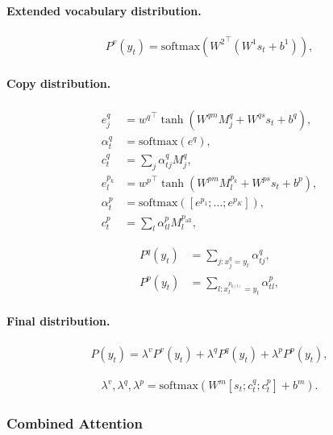 \documentclass[11pt,a4paper]{article}
\theoremstyle{mydef}
\theoremstyle{myprob}
\begin{document}
\paragraph{Extended vocabulary distribution.}

\begin{align}
P^v(y_t)  =\mathrm{softmax}({W^2}^\top (W^1 s_t  + b^1)),
\end{align}

\paragraph{Copy distribution.}

\begin{align}
e^q_j &= {w^q}^\top \tanh(W^{qm} M_j^q + W^{qs} s_t +b^q), \\
\alpha^q_t &= \mathrm{softmax}(e^q), \\ 
c^q_t &= \textstyle \sum_j \alpha^q_{tj} M_j^q, \\
e^{p_k}_l &= {w^p}^\top \tanh(W^{pm} M_l^{p_k} + W^{ps} s_t +b^p), \\
\alpha^p_t &= \mathrm{softmax}([e^{p_1}; \ldots; e^{p_K}]), \\
c^p_t &=  \textstyle \sum_{l} \alpha^p_{tl} M^{p_\mathrm{all}}_{l}, 
\end{align}

\begin{align}
P^q(y_t) &=  \textstyle \sum_{j: x^q_j = y_t} \alpha^q_{tj}, \\
P^p(y_t) &= \textstyle \sum_{l: x^{p_{k(l)}}_{l} = y_t} \alpha^p_{tl},
\end{align}

\paragraph{Final distribution.}

\begin{align}
P(y_t) = \lambda^v P^v(y_t) +  \lambda^q P^q(y_t) + \lambda^p P^p(y_t),
\end{align}

\begin{align}
\lambda^v, \lambda^q, \lambda^p = \mathrm{softmax}(W^m [s_t; c^q_t; c^p_t] + b^m).
\end{align}

\subsubsection{Combined Attention}
\end{document}

